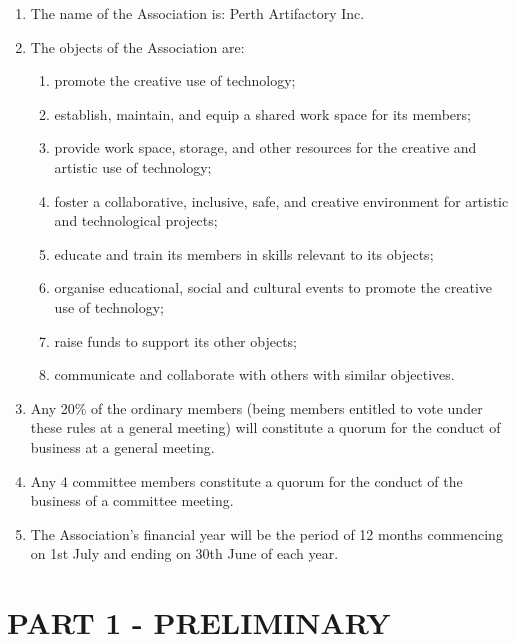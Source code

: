 \documentclass[../constitution.tex]{subfiles}
\begin{document}

\begin{enumerate}[label=\Alph*.]
  \item The name of the Association is: Perth Artifactory Inc.
  \item The objects of the Association are:
    \begin{enumerate}
    \item promote the creative use of technology;
    \item establish, maintain, and equip a shared work space for its members;
    \item provide work space, storage, and other resources for the creative and artistic use of technology;
    \item foster a collaborative, inclusive, safe, and creative environment for artistic and technological projects;
    \item educate and train its members in skills relevant to its objects;
    \item organise educational, social and cultural events to promote the creative use of technology;
    \item raise funds to support its other objects;
    \item communicate and collaborate with others with similar objectives.
    \end{enumerate}
  \item Any 20\% of the ordinary members (being members entitled to vote under these rules at a general meeting) will constitute a quorum for the conduct of business at a general meeting.
  \item Any 4 committee members constitute a quorum for the conduct of the business of a committee meeting.
  \item The Association's financial year will be the period of 12 months commencing on 1st July and ending on 30th June of each year.
\end{enumerate}




\part{PART 1 - PRELIMINARY} \label{part-1---preliminary}
\end{document}
